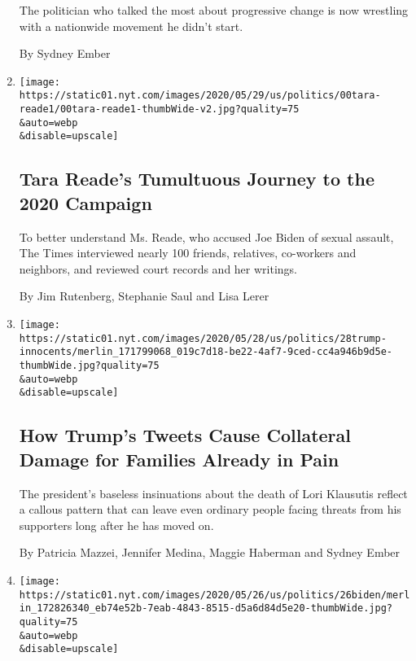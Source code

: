 \begin{enumerate}
  The politician who talked the most about progressive change is now
  wrestling with a nationwide movement he didn't start.

  By Sydney Ember
\item
  \href{/2020/05/31/us/politics/tara-reade-joe-biden.html}{}

  \texttt{[image: https://static01.nyt.com/images/2020/05/29/us/politics/00tara-reade1/00tara-reade1-thumbWide-v2.jpg?quality=75\\\&auto=webp\\\&disable=upscale]}

  \hypertarget{tara-reades-tumultuous-journey-to-the-2020-campaign}{%
  \subsection{Tara Reade's Tumultuous Journey to the 2020
  Campaign}\label{tara-reades-tumultuous-journey-to-the-2020-campaign}}

  To better understand Ms. Reade, who accused Joe Biden of sexual
  assault, The Times interviewed nearly 100 friends, relatives,
  co-workers and neighbors, and reviewed court records and her writings.

  By Jim Rutenberg, Stephanie Saul and Lisa Lerer
\item
  \href{/2020/05/29/us/politics/trump-scarborough-klausutis.html}{}

  \texttt{[image: https://static01.nyt.com/images/2020/05/28/us/politics/28trump-innocents/merlin\_171799068\_019c7d18-be22-4af7-9ced-cc4a946b9d5e-thumbWide.jpg?quality=75\\\&auto=webp\\\&disable=upscale]}

  \hypertarget{how-trumps-tweets-cause-collateral-damage-for-families-already-in-pain}{%
  \subsection{How Trump's Tweets Cause Collateral Damage for Families
  Already in
  Pain}\label{how-trumps-tweets-cause-collateral-damage-for-families-already-in-pain}}

  The president's baseless insinuations about the death of Lori
  Klausutis reflect a callous pattern that can leave even ordinary
  people facing threats from his supporters long after he has moved on.

  By Patricia Mazzei, Jennifer Medina, Maggie Haberman and Sydney Ember
\item
  \href{/2020/05/26/us/politics/joe-biden-facemasks-trump-coronavirus.html}{}

  \texttt{[image: https://static01.nyt.com/images/2020/05/26/us/politics/26biden/merlin\_172826340\_eb74e52b-7eab-4843-8515-d5a6d84d5e20-thumbWide.jpg?quality=75\\\&auto=webp\\\&disable=upscale]}


\end{enumerate}
